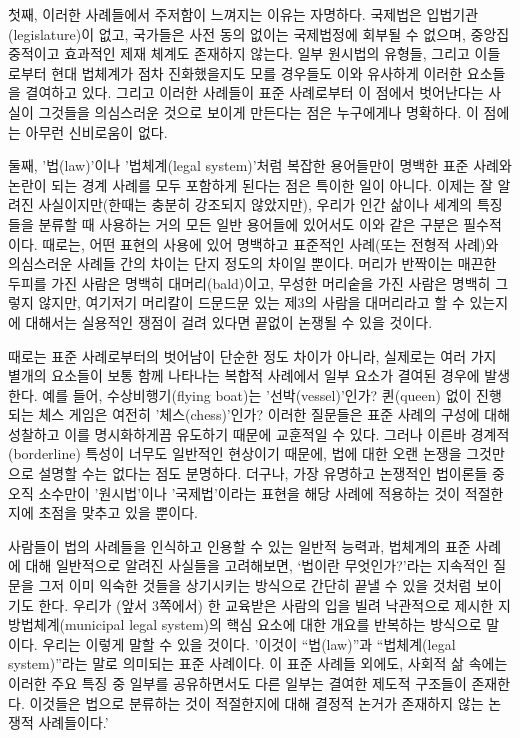 \documentclass[12pt, oneside]{book}  %
\begin{document}
첫째, 이러한 사례들에서 주저함이 느껴지는 이유는 자명하다. 국제법은
입법기관(legislature)이 없고, 국가들은 사전 동의 없이는 국제법정에
회부될 수 없으며, 중앙집중적이고 효과적인 제재 체계도 존재하지 않는다.
일부 원시법의 유형들, 그리고 이들로부터 현대 법체계가 점차 진화했을지도
모를 경우들도 이와 유사하게 이러한 요소들을 결여하고 있다. 그리고 이러한
사례들이 표준 사례로부터 이 점에서 벗어난다는 사실이 그것들을 의심스러운
것으로 보이게 만든다는 점은 누구에게나 명확하다. 이 점에는 아무런
신비로움이 없다.

둘째, '법(law)'이나 '법체계(legal system)'처럼 복잡한 용어들만이 명백한
표준 사례와 논란이 되는 경계 사례를 모두 포함하게 된다는 점은 특이한
일이 아니다. 이제는 잘 알려진 사실이지만(한때는 충분히 강조되지
않았지만), 우리가 인간 삶이나 세계의 특징들을 분류할 때 사용하는 거의
모든 일반 용어들에 있어서도 이와 같은 구분은 필수적이다. 때로는, 어떤
표현의 사용에 있어 명백하고 표준적인 사례(또는 전형적 사례)와 의심스러운
사례들 간의 차이는 단지 정도의 차이일 뿐이다. 머리가 반짝이는 매끈한
두피를 가진 사람은 명백히 대머리(bald)이고, 무성한 머리숱을 가진 사람은
명백히 그렇지 않지만, 여기저기 머리칼이 드문드문 있는 제3의 사람을
대머리라고 할 수 있는지에 대해서는 실용적인 쟁점이 걸려 있다면 끝없이
논쟁될 수 있을 것이다.

때로는 표준 사례로부터의 벗어남이 단순한 정도 차이가 아니라, 실제로는
여러 가지 별개의 요소들이 보통 함께 나타나는 복합적 사례에서 일부 요소가
결여된 경우에 발생한다. 예를 들어, 수상비행기(flying boat)는
'선박(vessel)'인가? 퀸(queen) 없이 진행되는 체스 게임은 여전히
'체스(chess)'인가? 이러한 질문들은 표준 사례의 구성에 대해 성찰하고 이를
명시화하게끔 유도하기 때문에 교훈적일 수 있다. 그러나 이른바
경계적(borderline) 특성이 너무도 일반적인 현상이기 때문에, 법에 대한
오랜 논쟁을 그것만으로 설명할 수는 없다는 점도 분명하다. 더구나, 가장
유명하고 논쟁적인 법이론들 중 오직 소수만이 '원시법'이나 '국제법'이라는
표현을 해당 사례에 적용하는 것이 적절한지에 초점을 맞추고 있을 뿐이다.

사람들이 법의 사례들을 인식하고 인용할 수 있는 일반적 능력과, 법체계의
표준 사례에 대해 일반적으로 알려진 사실들을 고려해보면, `법이란
무엇인가?'라는 지속적인 질문을 그저 이미 익숙한 것들을 상기시키는
방식으로 간단히 끝낼 수 있을 것처럼 보이기도 한다. 우리가 (앞서 3쪽에서)
한 교육받은 사람의 입을 빌려 낙관적으로 제시한 지방법체계(municipal
legal system)의 핵심 요소에 대한 개요를 반복하는 방식으로 말이다. 우리는
이렇게 말할 수 있을 것이다. '이것이 ``법(law)''과 ``법체계(legal
system)''라는 말로 의미되는 표준 사례이다. 이 표준 사례들 외에도, 사회적
삶 속에는 이러한 주요 특징 중 일부를 공유하면서도 다른 일부는 결여한
제도적 구조들이 존재한다. 이것들은 법으로 분류하는 것이 적절한지에 대해
결정적 논거가 존재하지 않는 논쟁적 사례들이다.'
\end{document}
